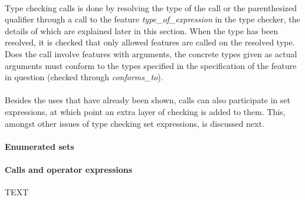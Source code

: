 \paragraph{}
Type checking calls is done by resolving the type of the call or the parenthesized qualifier through a call to the feature \textit{type\_of\_expression} in the type checker, the details of which are explained later in this section. When the type has been resolved, it is checked that only allowed features are called on the resolved type. Does the call involve features with arguments, the concrete types given as actual arguments must conform to the types specified in the specification of the feature in question (checked through \textit{conforms\_to}).
\paragraph{}
Besides the uses that have already been shown, calls can also participate in set expressions, at which point an extra layer of checking is added to them. This, amongst other issues of type checking set expressions, is discussed next.
\label{implementation-set-expressions}
\paragraph{Enumerated sets}
\paragraph{Calls and operator expressions}
TEXT
\label{implementation-def-boolean-type}